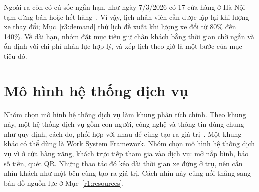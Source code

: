 Ngoài ra còn có cú sốc ngắn hạn, như ngày 7/3/2026 có 17 cửa hàng ở Hà Nội tạm dừng bán hoặc hết hàng~\cite{vtc2026}. Vì vậy, lịch nhân viên cần được lập lại khi lượng xe thay đổi; Mục~\ref{r3:demand} thử lịch đề xuất khi lượng xe đổi từ 80\% đến 140\%. Về dài hạn, nhóm đặt mục tiêu giữ chân khách bằng thời gian chờ ngắn và ổn định với chi phí nhân lực hợp lý, và xếp lịch theo giờ là một bước của mục tiêu đó.

\section{Mô hình hệ thống dịch vụ}
\label{r1:system}
\noindent
Nhóm chọn mô hình hệ thống dịch vụ làm khung phân tích chính. Theo khung này, một hệ thống dịch vụ gồm con người, công nghệ và thông tin dùng chung như quy định, cách đo, phối hợp với nhau để cùng tạo ra giá trị~\cite{maglio2008}. Một khung khác có thể dùng là Work System Framework. Nhóm chọn mô hình hệ thống dịch vụ vì ở cửa hàng xăng, khách trực tiếp tham gia vào dịch vụ: mở nắp bình, báo số tiền, quét QR. Những thao tác đó kéo dài thời gian xe đứng ở trụ, nên cần nhìn khách như một bên cùng tạo ra giá trị. Cách nhìn này cũng nối thẳng sang bản đồ nguồn lực ở Mục~\ref{r1:resources}.

